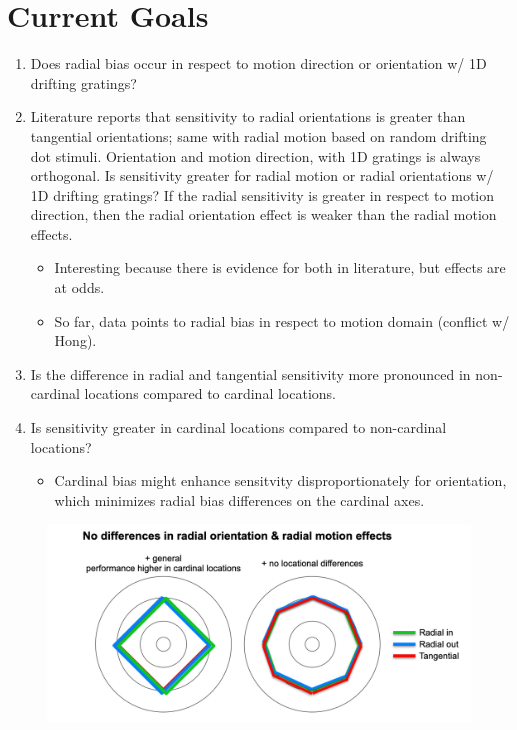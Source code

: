 \documentclass[11pt]{article} %
\begin{document}
\section{Current Goals} 
\begin{enumerate}
	\item Does radial bias occur in respect to motion direction or orientation w/ 1D drifting gratings? 
	\item Literature reports that sensitivity to radial orientations is greater than tangential orientations; same with radial motion based on random drifting dot stimuli. Orientation and motion direction, with 1D gratings is always orthogonal. Is sensitivity greater for radial motion or radial orientations w/ 1D drifting gratings? If the radial sensitivity is greater in respect to motion direction, then the radial orientation effect is weaker than the radial motion effects.
	\begin{itemize}
	\item{Interesting because there is evidence for both in literature, but effects are at odds.} 
	\item{So far, data points to radial bias in respect to motion domain (conflict w/ Hong).}
	\end{itemize}
	\item Is the difference in radial and tangential sensitivity more pronounced in non-cardinal locations compared to cardinal locations.
	\item Is sensitivity greater in cardinal locations compared to non-cardinal locations?
	\begin{itemize}
	\item{Cardinal bias might enhance sensitvity disproportionately for orientation, which minimizes radial bias differences on the cardinal axes.}
	\end{itemize}
	\end{enumerate}
	\begin{figure}[H]
	\centering %
	\includegraphics[scale=.25]{Images/Cartoon1.png}
	\end{figure}
\end{document}

